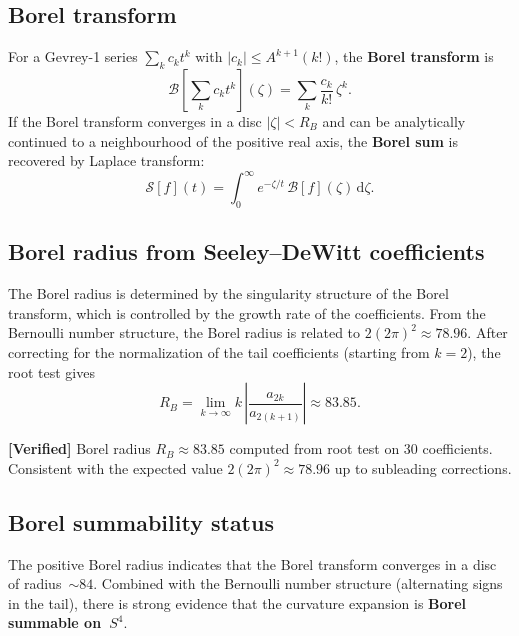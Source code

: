 \documentclass[11pt,a4paper]{article}
\renewcommand{\dd}{\mathrm{d}}
\theoremstyle{plain}
\theoremstyle{definition}
\newcommand{\verified}[1]{%
  \par\smallskip\noindent
  \colorbox{green!10}{\parbox{\dimexpr\linewidth-2\fboxsep}{%
    \textcolor{green!50!black}{\textbf{[Verified]}} #1}}%
  \par\smallskip}
\begin{document}
\subsection{Borel transform}

For a Gevrey-1 series $\sum_k c_k t^k$ with $|c_k| \leq A^{k+1}(k!)$, the
\textbf{Borel transform} is
\begin{equation}\label{eq:borel-def}
  \mathcal{B}\!\left[\sum_k c_k t^k\right](\zeta) = \sum_k \frac{c_k}{k!}\,\zeta^k.
\end{equation}
If the Borel transform converges in a disc $|\zeta| < R_B$ and can be
analytically continued to a neighbourhood of the positive real axis, the
\textbf{Borel sum} is recovered by Laplace transform:
\begin{equation}\label{eq:borel-sum}
  \mathcal{S}[f](t) = \int_0^\infty e^{-\zeta/t}\,
  \mathcal{B}[f](\zeta)\,\dd\zeta.
\end{equation}

\subsection{Borel radius from Seeley--DeWitt coefficients}

The Borel radius is determined by the singularity structure of the Borel
transform, which is controlled by the growth rate of the coefficients.
From the Bernoulli number structure, the Borel radius is related to
$2(2\pi)^2 \approx 78.96$.  After correcting for the normalization of the
tail coefficients (starting from $k = 2$), the root test gives
\begin{equation}\label{eq:borel-radius}
  R_B = \lim_{k\to\infty} k\,\left|\frac{a_{2k}}{a_{2(k+1)}}\right|
  \approx 83.85.
\end{equation}

\verified{Borel radius $R_B \approx 83.85$ computed from root test on
30 coefficients.  Consistent with the expected value $2(2\pi)^2 \approx 78.96$
up to subleading corrections.}

\subsection{Borel summability status}

The positive Borel radius indicates that the Borel transform converges in a
disc of radius~$\sim\!84$.  Combined with the Bernoulli number structure
(alternating signs in the tail), there is strong evidence that the curvature
expansion is \textbf{Borel summable on~$S^4$}.
\end{document}
